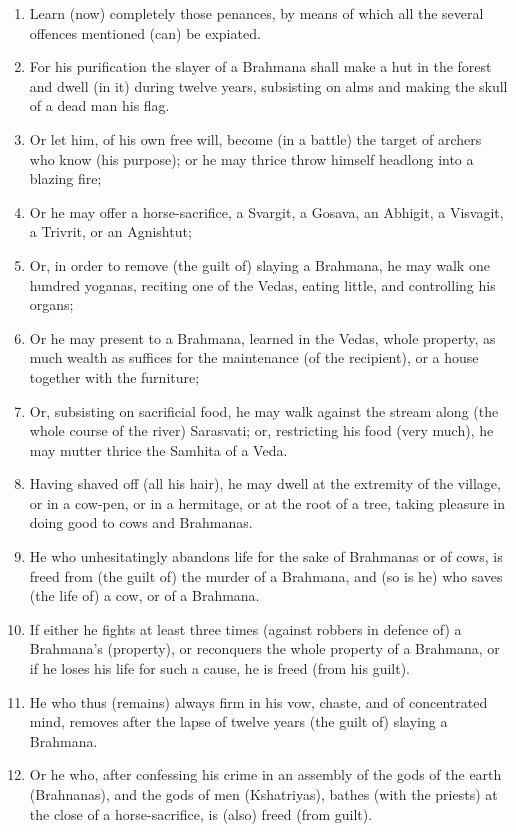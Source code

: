 \begin{enumerate}
\item Learn (now) completely those penances, by means of which all the several offences mentioned (can) be expiated.
\item For his purification the slayer of a Brahmana shall make a hut in the forest and dwell (in it) during twelve years, subsisting on alms and making the skull of a dead man his flag.
\item Or let him, of his own free will, become (in a battle) the target of archers who know (his purpose); or he may thrice throw himself headlong into a blazing fire;
\item Or he may offer a horse-sacrifice, a Svargit, a Gosava, an Abhigit, a Visvagit, a Trivrit, or an Agnishtut;
\item Or, in order to remove (the guilt of) slaying a Brahmana, he may walk one hundred yoganas, reciting one of the Vedas, eating little, and controlling his organs;
\item Or he may present to a Brahmana, learned in the Vedas, whole property, as much wealth as suffices for the maintenance (of the recipient), or a house together with the furniture;
\item Or, subsisting on sacrificial food, he may walk against the stream along (the whole course of the river) Sarasvati; or, restricting his food (very much), he may mutter thrice the Samhita of a Veda.
\item Having shaved off (all his hair), he may dwell at the extremity of the village, or in a cow-pen, or in a hermitage, or at the root of a tree, taking pleasure in doing good to cows and Brahmanas.
\item He who unhesitatingly abandons life for the sake of Brahmanas or of cows, is freed from (the guilt of) the murder of a Brahmana, and (so is he) who saves (the life of) a cow, or of a Brahmana.
\item If either he fights at least three times (against robbers in defence of) a Brahmana's (property), or reconquers the whole property of a Brahmana, or if he loses his life for such a cause, he is freed (from his guilt).
\item He who thus (remains) always firm in his vow, chaste, and of concentrated mind, removes after the lapse of twelve years (the guilt of) slaying a Brahmana.
\item Or he who, after confessing his crime in an assembly of the gods of the earth (Brahnanas), and the gods of men (Kshatriyas), bathes (with the priests) at the close of a horse-sacrifice, is (also) freed (from guilt).

\end{enumerate}
